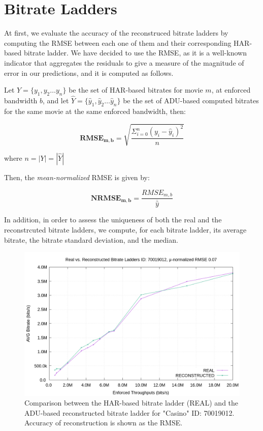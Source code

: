\section{Bitrate Ladders}

At first, we evaluate the accuracy of the reconstruced bitrate ladders by
computing the RMSE between each one of them and their corresponding HAR-based
bitrate ladder. We have decided to use the RMSE, as it is a well-known
indicator that aggregates the residuals to give a measure of the magnitude of
error in our predictions, and it is computed as follows.

Let $Y=\{y_1, y_2 \dots y_n\}$ be the set of HAR-based bitrates for movie $m$,
at enforced bandwidth $b$, and let $\hat{Y}=\{\hat{y}_1, \hat{y}_2 \dots
\hat{y}_n\}$ be the set of ADU-based computed bitrates for the same movie at
the same enforced bandwidth, then:

\begin{equation*}
    \mathbf{RMSE_{m, b}} = \sqrt{\dfrac{\Sigma_{i=0}^{n}(y_i - \hat{y}_i)^2}{n}}
\end{equation*}

where $n = |Y| = |\hat{Y}|$

Then, the \emph{mean-normalized} RMSE is given by:

\begin{equation*}
    \mathbf{NRMSE_{m, b}} = \dfrac{RMSE_{m, b}}{\overline{\hat{y}}}
\end{equation*}

In addition, in order to assess the uniqueness of both the real and the
reconstrcuted bitrate ladders, we compute, for each bitrate ladder, its average
bitrate, the bitrate standard deviation, and the median. 

\begin{figure}[!h]
  \centering
  \includegraphics[width=\columnwidth]{img/70019012.png}
  \caption{Comparison between the HAR-based bitrate ladder (REAL) and the
  ADU-based reconstructed bitrate ladder for "Casino" ID: 70019012. Accuracy of
  reconstruction is shown as the RMSE.}
  \label{fig:bl_comparison_good}
\end{figure}


